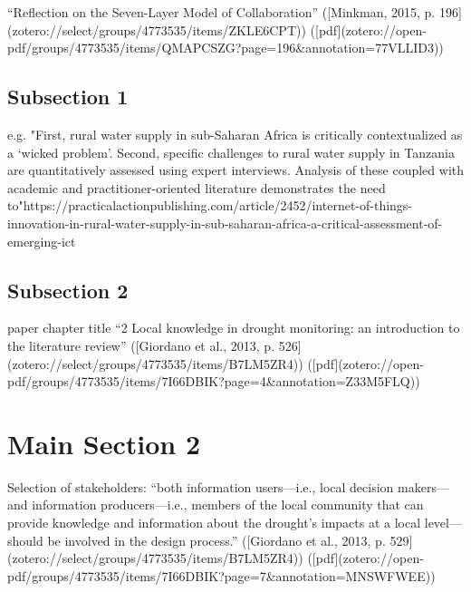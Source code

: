 “Reflection on the Seven-Layer Model of Collaboration” ([Minkman, 2015, p. 196](zotero://select/groups/4773535/items/ZKLE6CPT)) ([pdf](zotero://open-pdf/groups/4773535/items/QMAPCSZG?page=196&annotation=77VLLID3))



\subsection{Subsection 1}
e.g.
"First, rural water supply in sub-Saharan Africa is critically contextualized as a ‘wicked problem’. Second, specific challenges to rural water supply in Tanzania are quantitatively assessed using expert interviews. Analysis of these coupled with academic and practitioner-oriented literature demonstrates the need to"https://practicalactionpublishing.com/article/2452/internet-of-things-innovation-in-rural-water-supply-in-sub-saharan-africa-a-critical-assessment-of-emerging-ict


\subsection{Subsection 2}
paper chapter title
“2 Local knowledge in drought monitoring: an introduction to the literature review” ([Giordano et al., 2013, p. 526](zotero://select/groups/4773535/items/B7LM5ZR4)) ([pdf](zotero://open-pdf/groups/4773535/items/7I66DBIK?page=4&annotation=Z33M5FLQ))

\section{Main Section 2}

Selection of stakeholders:
“both information users—i.e., local decision makers—and information producers—i.e., members of the local community that can provide knowledge and information about the drought’s impacts at a local level—should be involved in the design process.” ([Giordano et al., 2013, p. 529](zotero://select/groups/4773535/items/B7LM5ZR4)) ([pdf](zotero://open-pdf/groups/4773535/items/7I66DBIK?page=7\&annotation=MNSWFWEE))

